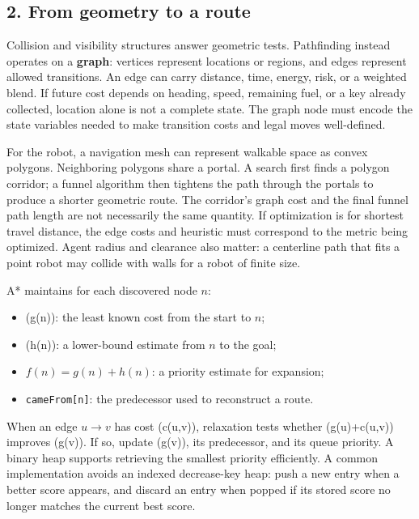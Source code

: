 \subsection{2. From geometry to a route}\label{05-engine-i-ch008-from-geometry-to-a-route}

Collision and visibility structures answer geometric tests. Pathfinding instead operates on a \textbf{graph}: vertices represent locations or regions, and edges represent allowed transitions. An edge can carry distance, time, energy, risk, or a weighted blend. If future cost depends on heading, speed, remaining fuel, or a key already collected, location alone is not a complete state. The graph node must encode the state variables needed to make transition costs and legal moves well-defined.

For the robot, a navigation mesh can represent walkable space as convex polygons. Neighboring polygons share a portal. A search first finds a polygon corridor; a funnel algorithm then tightens the path through the portals to produce a shorter geometric route. The corridor's graph cost and the final funnel path length are not necessarily the same quantity. If optimization is for shortest travel distance, the edge costs and heuristic must correspond to the metric being optimized. Agent radius and clearance also matter: a centerline path that fits a point robot may collide with walls for a robot of finite size.

A* maintains for each discovered node \(n\):

\begin{itemize}
\tightlist
\item
  (g(n)): the least known cost from the start to \(n\);
\item
  (h(n)): a lower-bound estimate from \(n\) to the goal;
\item
  \(f(n)=g(n)+h(n)\): a priority estimate for expansion;
\item
  \texttt{cameFrom{[}n{]}}: the predecessor used to reconstruct a route.
\end{itemize}

When an edge \(u\rightarrow v\) has cost (c(u,v)), relaxation tests whether (g(u)+c(u,v)) improves (g(v)). If so, update (g(v)), its predecessor, and its queue priority. A binary heap supports retrieving the smallest priority efficiently. A common implementation avoids an indexed decrease-key heap: push a new entry when a better score appears, and discard an entry when popped if its stored score no longer matches the current best score.

